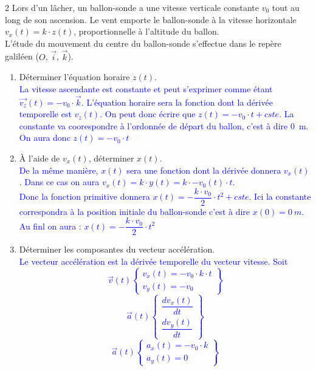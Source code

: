 \documentclass[a4paper,11pt,fleqn]{article}%
\begin{document}
\begin{multicols}{2}
Lors d'un lâcher, un ballon-sonde a une vitesse verticale constante $v_0$ tout au long de son ascension. Le vent emporte le ballon-sonde à la vitesse horizontale $v_x(t) = k \cdot z(t)$, proportionnelle à l'altitude du ballon.\\
L'étude du mouvement du centre du ballon-sonde s'effectue dans le repère galiléen ($O$, $\vec{i}$, $\vec{k}$).
\begin{enumerate}
	\item Déterminer l'équation horaire $z(t)$.\\
\textcolor{blue}{La vitesse ascendante est constante et peut s'exprimer comme étant $\vec{v_z}(t) = -v_0\cdot \vec{k}$. L'équation horaire sera la fonction dont la dérivée temporelle est $v_z(t)$. On peut donc écrire que $z(t) = -v_0 \cdot t + cste$. La constante va coorespondre à l'ordonnée de départ du ballon, c'est à dire \SI{0}{m}. On aura donc $z(t) = -v_0 \cdot t$}
	\item À l'aide de $v_x(t)$, déterminer $x(t)$.\\
\textcolor{blue}{De la même manière, $x(t)$ sera une fonction dont la dérivée donnera $v_x(t)$. Dans ce cas on aura $v_x(t) = k \cdot y(t) = k \cdot -v_0(t) \cdot t$. \\ Donc la fonction primitive donnera $ x(t) = -\dfrac{k \cdot v_0}{2} \cdot t^2 + cste$. Ici la constante correspondra à la position initiale du ballon-sonde c'est à dire $x(0)=\SI{0}{m}$.\\
Au finl on aura : $ x(t) = -\dfrac{k \cdot v_0}{2} \cdot t^2$ }
	\item Déterminer les composantes du vecteur accélération.\\
\textcolor{blue}{Le vecteur accélération est la dérivée temporelle du vecteur vitesse. Soit $$ \vec{v}(t) \left\{
	\begin{array}{c}
		v_x(t) = -v_0\cdot k \cdot t\\
		v_y(t) = -v_0 
	\end{array}
\right\}$$ 
$$ \vec{a}(t) \left\{
	\begin{array}{c}
		\dfrac{dv_x(t)}{dt}\\
		\dfrac{dv_y(t)}{dt} 
	\end{array}
\right\}$$
$$ \vec{a}(t) \left\{
	\begin{array}{c}
		a_x(t) = -v_0 \cdot k\\
		a_y(t) = 0
	\end{array}
\right\}$$
}
\end{enumerate}


\end{multicols}
\end{document}
